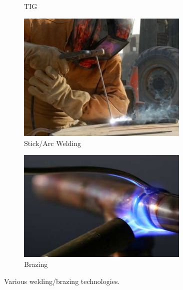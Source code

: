 \begin{figure}[H]
\begin{subfigure}[b]{.24\linewidth}
			\caption{TIG}
		\end{subfigure}\begin{subfigure}[b]{.24\linewidth}
			\includegraphics[width=0.9\textwidth]{imgs/arcweld.png}
			\caption{Stick/Arc Welding}
		\end{subfigure}\begin{subfigure}[b]{.24\linewidth}
			\includegraphics[width=0.9\textwidth]{imgs/braze.png}
			\caption{Brazing}
		\end{subfigure}
		\caption{Various welding/brazing technologies.}
	\end{figure}
 	
